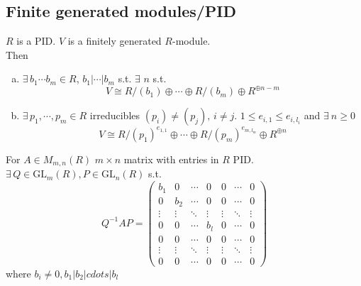 \subsection{Finite generated modules/PID}
\begin{theorem}
     $ R  $ is a PID.  $ V  $ is a finitely generated  $ R $-module.\\
     Then 
     \begin{enumerate}[(a)]
        \item  $ \exists \,b_1\cdots b_m\in R $,  $ b_1|\cdots|b_m $ s.t.  $ \exists $  $ n $ s.t.
        \[V\cong R/(b_1)\oplus \cdots \oplus R/(b_m)\oplus R^{\oplus n-m}\]  
        \item  $ \exists\, p_1,\cdots,p_m\in R $ irreducibles  $ (p_i)\not=(p_j),\,i\not=j $.  $ 1 \leq e_{i,1} \leq e_{i,l_i} $ and  $ \exists\ n \geq 0 $
        \[V\cong R/(p_1)^{e_{1,1}}\oplus \cdots \oplus R/(p_m)^{e_{m,l_m}}\oplus R^{\oplus n}\] 
     \end{enumerate}
\end{theorem}
\begin{corollary}
    For  $ A\in M_{m,n}(R) $  $ m\times n $ matrix with entries in  $ R  $ PID.  $ \exists \, Q\in \mathrm{GL}_m(R),P\in \mathrm{GL}_n(R) $ s.t.
    \begin{equation*}
        Q^{-1}AP=\begin{pmatrix}
            b_1&0&\cdots&0&0&\cdots&0\\
            0&b_2&\cdots&0&0&\cdots&0\\
            \vdots&\vdots&\ddots&\vdots&\vdots&\ddots&\vdots\\
            0&0&\cdots&b_l&0&\cdots&0\\
            0&0&\cdots&0&0&\cdots&0\\
            \vdots&\vdots&\ddots&\vdots&\vdots&\ddots&\vdots\\
            0&0&\cdots&0&0&\cdots&0
        \end{pmatrix}
    \end{equation*}
    where  $ b_i\not=0,b_1|b_2|cdots|b_l $ 
\end{corollary}